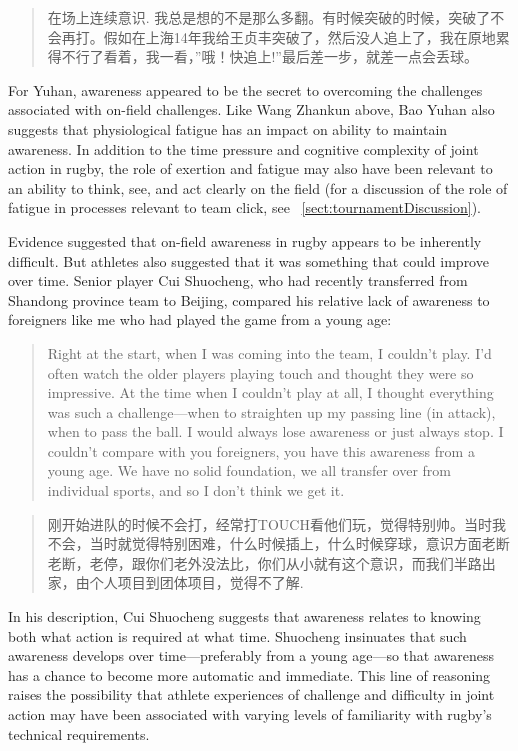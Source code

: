 \begin{CJK}{UTF8}{gbsn}
    \begin{quote}
    在场上连续意识. 我总是想的不是那么多翻。有时候突破的时候，突破了不会再打。假如在上海14年我给王贞丰突破了，然后没人追上了，我在原地累得不行了看着，我一看，''哦！快追上!''最后差一步，就差一点会丢球。
    \end{quote}

For Yuhan, awareness appeared to be the secret to overcoming the challenges associated with on-field challenges.  Like Wang Zhankun above, Bao Yuhan also suggests that physiological fatigue has an impact on ability to maintain awareness. In addition to the time pressure and cognitive complexity of joint action in rugby, the role of exertion and fatigue may also have been relevant to an ability to think, see, and act clearly on the field (for a discussion of the role of fatigue in processes relevant to team click, see ~\ref{sect:tournamentDiscussion}).

Evidence suggested that on-field awareness in rugby appears to be inherently difficult.  But athletes also suggested that it was something that could improve over time.  Senior player Cui Shuocheng, who had recently transferred from Shandong province team to Beijing, compared his relative lack of awareness to foreigners like me who had played the game from a young age:

      \begin{quote}
      Right at the start, when I was coming into the team, I couldn't play. I'd often watch the older players playing touch and thought they were so impressive.  At the time when I couldn't play at all, I thought everything was such a challenge---when to straighten up my passing line (in attack), when to pass the ball.  I would always lose awareness or just always stop. I couldn't compare with you foreigners, you have this awareness from a young age.  We have no solid foundation, we all transfer over from individual sports, and so I don't think we get it.
      \end{quote}

      \begin{quote}
      刚开始进队的时候不会打，经常打TOUCH看他们玩，觉得特别帅。当时我不会，当时就觉得特别困难，什么时候插上，什么时候穿球，意识方面老断老断，老停，跟你们老外没法比，你们从小就有这个意识，而我们半路出家，由个人项目到团体项目，觉得不了解.
      \end{quote}
In his description, Cui Shuocheng suggests that awareness relates to knowing both what action is required at what time. Shuocheng insinuates that such awareness develops over time---preferably from a young age---so that awareness has a chance to become more automatic and immediate.  This line of reasoning raises the possibility that athlete experiences of challenge and difficulty in joint action may have been associated with varying levels of familiarity with rugby's technical requirements.








\end{CJK}
